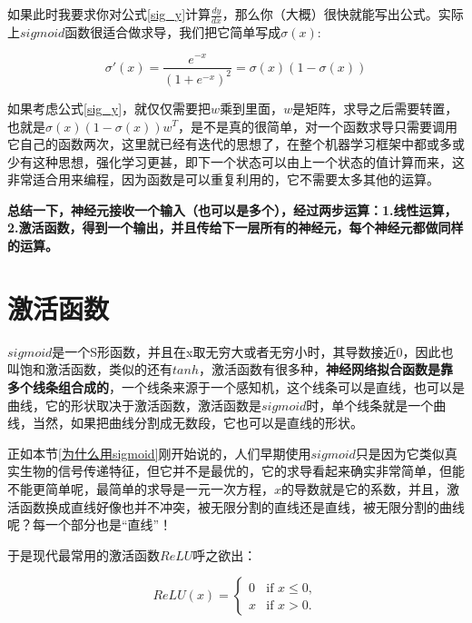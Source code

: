 \documentclass[a5paper, 11pt]{ctexbook}
\begin{document}
如果此时我要求你对公式\ref{sig_y}计算$\frac{dy}{dx}$，那么你（大概）很快就能写出公式。实际上$sigmoid$函数很适合做求导，我们把它简单写成$\sigma(x)$:

\begin{equation}
    \sigma'(x) = \frac{e^{-x}}{(1+e^{-x})^2}=\sigma(x)(1 - \sigma(x))
\end{equation}

如果考虑公式\ref{sig_y}，就仅仅需要把$w$乘到里面，$w$是矩阵，求导之后需要转置，也就是$\sigma(x)(1 - \sigma(x))w^T$，是不是真的很简单，对一个函数求导只需要调用它自己的函数两次，这里就已经有迭代的思想了，在整个机器学习框架中都或多或少有这种思想，强化学习更甚，即下一个状态可以由上一个状态的值计算而来，这非常适合用来编程，因为函数是可以重复利用的，它不需要太多其他的运算。

\textbf{总结一下，神经元接收一个输入（也可以是多个），经过两步运算：1.线性运算，2.激活函数，得到一个输出，并且传给下一层所有的神经元，每个神经元都做同样的运算。}

\section{激活函数}
$sigmoid$是一个S形函数，并且在x取无穷大或者无穷小时，其导数接近0，因此也叫饱和激活函数，类似的还有$tanh$，激活函数有很多种，\textbf{神经网络拟合函数是靠多个线条组合成的}，一个线条来源于一个感知机，这个线条可以是直线，也可以是曲线，它的形状取决于激活函数，激活函数是$sigmoid$时，单个线条就是一个曲线，当然，如果把曲线分割成无数段，它也可以是直线的形状。

正如本节\ref{为什么用sigmoid}刚开始说的，人们早期使用$sigmoid$只是因为它类似真实生物的信号传递特征，但它并不是最优的，它的求导看起来确实非常简单，但能不能更简单呢，最简单的求导是一元一次方程，$x$的导数就是它的系数，并且，激活函数换成直线好像也并不冲突，被无限分割的直线还是直线，被无限分割的曲线呢？每一个部分也是“直线”！

于是现代最常用的激活函数$ReLU$呼之欲出：

\begin{equation}
    \label{Relu函数}
    ReLU(x) =
    \begin{cases}
        0 & \text{if } x \le 0, \\
        x & \text{if } x > 0.
    \end{cases}
\end{equation}
\end{document}
